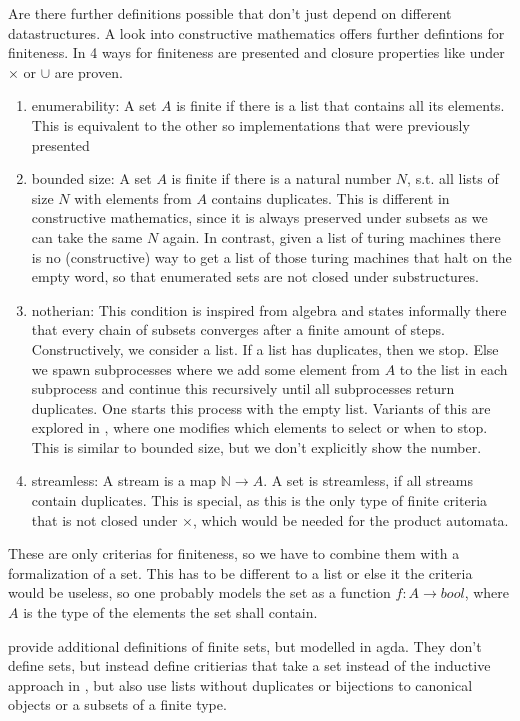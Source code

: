 \documentclass{article}
\begin{document}
 Are there further definitions possible that don't just depend on different datastructures. A look into constructive mathematics offers further defintions for finiteness.
In \cite{Constructive} 4 ways for finiteness are presented and closure properties like under $\times$ or $\cup$ are proven.
\begin{enumerate}
\item enumerability: A set $A$ is finite if there is a list that contains all its elements. This is equivalent to the other so implementations that were previously presented
\item bounded size:  A set $A $ is finite if there is a natural number $N$, s.t. all lists of size $N$ with elements from $A$ contains duplicates. This is different in constructive mathematics, since it is always preserved under subsets as we can take the same $N$ again. In contrast, given a list of turing machines there is no (constructive) way to get a list of those turing machines that halt on the empty word, so that enumerated sets are not closed under substructures.
\item notherian: This condition is inspired from algebra and states informally there that every chain of subsets converges after a finite amount of steps. Constructively, we consider a list. If a list has duplicates, then we stop. Else we spawn subprocesses where we add some element from $A$ to the list in each subprocess and continue this recursively until all subprocesses return duplicates. One starts this process with the empty list. Variants of this are explored in \cite{noetherian}, where one modifies which elements to select or when to stop. This is similar to bounded size, but we don't explicitly show the number.
\item streamless: A stream is a map $\mathbb{N} \to A$. A set is streamless, if all streams contain duplicates. This is special, as this is the only type of finite criteria that is not closed under $\times$, which would be needed for the product automata.
\end{enumerate}

These are only criterias for finiteness, so we have to combine them with a formalization of a set. This has to be different to a list or else it the criteria would be useless, so one probably models the set as a function $f: A \to bool$, where $A$ is the type of the elements the set shall contain.

\cite{finsetAgda} provide additional definitions of finite sets, but modelled in agda. They don't define sets, but instead define critierias that take a set instead of the inductive approach in \cite{HoTT-FinSets}, but also use lists without duplicates or bijections to canonical objects or a subsets of a finite type.
\end{document}
